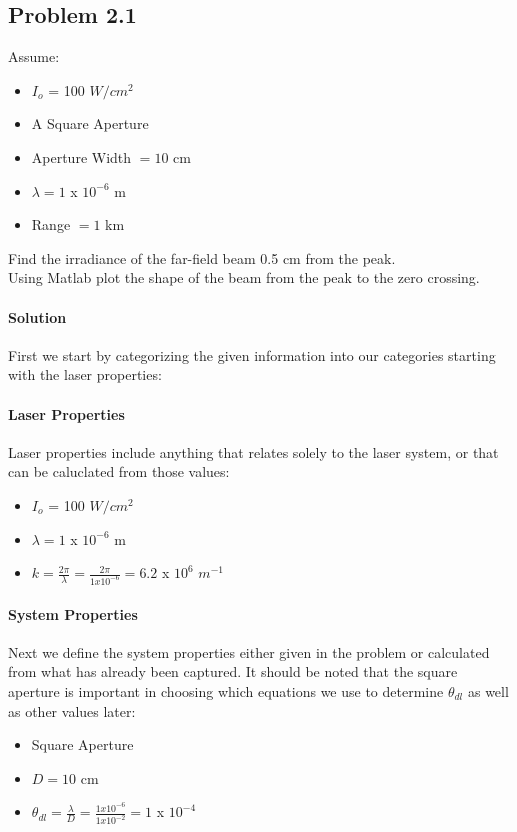 \documentclass[]{article}
\begin{document}
\subsection{Problem 2.1}
Assume: 
\begin{itemize}
\item $I_{o}$ = 100 $W/cm^2$
\item A Square Aperture
\item Aperture Width $= 10$ cm
\item $\lambda = 1$ x $10^{-6}$ m
\item Range $= 1 $ km
\end{itemize}
Find the irradiance of the far-field beam 0.5 cm from the peak.\\
Using Matlab plot the shape of the beam from the peak to the zero crossing.
\paragraph{Solution}
First we start by categorizing the given information into our categories starting with the laser properties:

\paragraph{Laser Properties}
Laser properties include anything that relates solely to the laser system, or that can be caluclated from those values:
\begin{itemize}
\item $I_{o}$ = 100 $W/cm^2$ 
\item $\lambda = 1$ x $10^{-6}$ m
\item $k = \frac{2 \pi}{\lambda} = \frac{2 \pi}{1 x 10^{-6}} = 6.2$ x $10^{6}$ $m^{-1}$
\end{itemize}

\paragraph{System Properties}
Next we define the system properties either given in the problem or calculated from what has already been captured.  It should be noted that the square aperture is important in choosing which equations we use to determine $\theta_{dl}$ as well as other values later:
\begin{itemize}
\item Square Aperture
\item $D = 10$ cm
\item $\theta_{dl} = \frac{\lambda}{D} = \frac{1 x 10^{-6}}{1 x 10^{-2}} = 1$ x $10^{-4}$
\end{itemize}
\end{document}
